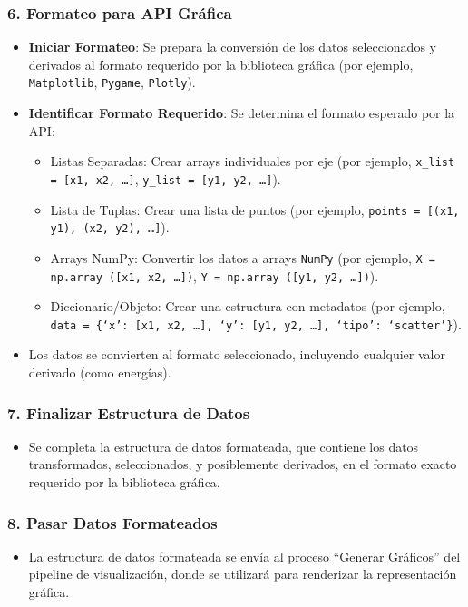 \subsubsection*{6. Formateo para API Gráfica}
\begin{itemize}
    \item \textbf{Iniciar Formateo}: Se prepara la conversión de los datos seleccionados y derivados al formato requerido por la biblioteca gráfica (por ejemplo, \texttt{Matplotlib}, \texttt{Pygame}, \texttt{Plotly}).
    \item \textbf{Identificar Formato Requerido}: Se determina el formato esperado por la API:\
    \begin{itemize}
        \item Listas Separadas: Crear arrays individuales por eje (por ejemplo, \texttt{x\_list = [x1, x2, \ldots]}, \texttt{y\_list = [y1, y2, \ldots]}).
        \item Lista de Tuplas: Crear una lista de puntos (por ejemplo, \texttt{points = [(x1, y1), (x2, y2), \ldots]}).
        \item Arrays NumPy: Convertir los datos a arrays \texttt{NumPy} (por ejemplo, \texttt{X = np.array~([x1, x2, \ldots])}, \texttt{Y = np.array~([y1, y2, \ldots])}).
        \item Diccionario/Objeto: Crear una estructura con metadatos (por ejemplo, \texttt{data = \{`x': [x1, x2, \ldots], `y': [y1, y2, \ldots], `tipo': `scatter'\}}).
    \end{itemize}
    \item Los datos se convierten al formato seleccionado, incluyendo cualquier valor derivado (como energías).
\end{itemize}

\subsubsection*{7. Finalizar Estructura de Datos}
\begin{itemize}
    \item Se completa la estructura de datos formateada, que contiene los datos transformados, seleccionados, y posiblemente derivados, en el formato exacto requerido por la biblioteca gráfica.
\end{itemize}

\subsubsection*{8. Pasar Datos Formateados}
\begin{itemize}
    \item La estructura de datos formateada se envía al proceso ``Generar Gráficos'' del pipeline de visualización, donde se utilizará para renderizar la representación gráfica.
\end{itemize}


